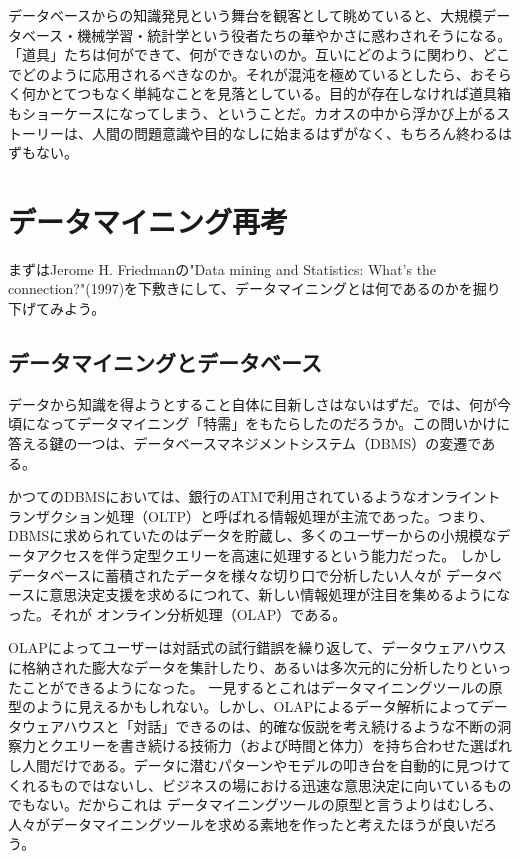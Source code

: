 データベースからの知識発見という舞台を観客として眺めていると、大規模データベース・機械学習・統計学という役者たちの華やかさに惑わされそうになる。「道具」たちは何ができて、何ができないのか。互いにどのように関わり、どこでどのように応用されるべきなのか。それが混沌を極めているとしたら、おそらく何かとてつもなく単純なことを見落としている。目的が存在しなければ道具箱もショーケースになってしまう、ということだ。カオスの中から浮かび上がるストーリーは、人間の問題意識や目的なしに始まるはずがなく、もちろん終わるはずもない。

\section{データマイニング再考}
まずはJerome H. Friedmanの"Data mining and Statistics: What's the connection?"(1997)を下敷きにして、データマイニングとは何であるのかを掘り下げてみよう。

\subsection{データマイニングとデータベース}
データから知識を得ようとすること自体に目新しさはないはずだ。では、何が今頃になってデータマイニング「特需」をもたらしたのだろうか。この問いかけに答える鍵の一つは、データベースマネジメントシステム（DBMS）の変遷である。

かつてのDBMSにおいては、銀行のATMで利用されているようなオンライントランザクション処理（OLTP）と呼ばれる情報処理が主流であった。つまり、DBMSに求められていたのはデータを貯蔵し、多くのユーザーからの小規模なデータアクセスを伴う定型クエリーを高速に処理するという能力だった。
しかしデータベースに蓄積されたデータを様々な切り口で分析したい人々が
データベースに意思決定支援を求めるにつれて、新しい情報処理が注目を集めるようになった。それが
オンライン分析処理（OLAP）である。

OLAPによってユーザーは対話式の試行錯誤を繰り返して、データウェアハウスに格納された膨大なデータを集計したり、あるいは多次元的に分析したりといったことができるようになった。
一見するとこれはデータマイニングツールの原型のように見えるかもしれない。しかし、OLAPによるデータ解析によってデータウェアハウスと「対話」できるのは、的確な仮説を考え続けるような不断の洞察力とクエリーを書き続ける技術力（および時間と体力）を持ち合わせた選ばれし人間だけである。データに潜むパターンやモデルの叩き台を自動的に見つけてくれるものではないし、ビジネスの場における迅速な意思決定に向いているものでもない。だからこれは
データマイニングツールの原型と言うよりはむしろ、人々がデータマイニングツールを求める素地を作ったと考えたほうが良いだろう。

